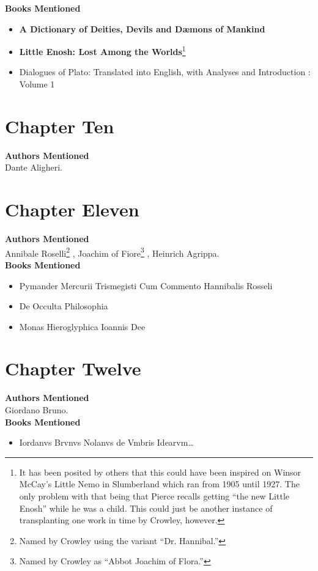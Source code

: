 \documentclass[twoside,10pt]{report}
\begin{document}
\textbf{Books Mentioned}
\begin{itemize}
\item \textbf{A Dictionary of Deities, Devils and Dæmons of Mankind} \cite{St.Phalle}
\item \textbf{Little Enosh: Lost Among the Worlds}\footnote{It has been posited by others that this could have been inspired on Winsor McCay’s Little Nemo in Slumberland which ran from 1905 until 1927. The only problem with that being that Pierce recalls getting “the new Little Enosh” while he was a child. This could just be another instance of transplanting one work in time by Crowley, however.} \cite{enosh}
\item Dialogues of Plato: Translated into English, with Analyses and Introduction : Volume 1 \cite{Jowett1871}
\end{itemize}

\section{Chapter Ten}
\textbf{Authors Mentioned}\\
Dante Aligheri.

\section{Chapter Eleven}
\textbf{Authors Mentioned}\\
Annibale Roselli\footnote{Named by Crowley using the variant ``Dr. Hannibal.''} , Joachim of Fiore\footnote{Named by Crowley as ``Abbot Joachim of Flora.''} , Heinrich Agrippa.
\\

\textbf{Books Mentioned}
\begin{itemize}
\item Pymander Mercurii Trismegisti Cum Commento Hannibalis Rosseli \cite{Rosselli1585}
\item De Occulta Philosophia \cite{Nettesheim1565}
\item Monas Hieroglyphica Ioannis Dee \cite{Dee1564}
\end{itemize}

\section{Chapter Twelve}
\textbf{Authors Mentioned}\\
Giordano Bruno.
\\

\textbf{Books Mentioned}
\begin{itemize}
\item Iordanvs Brvnvs Nolanvs de Vmbris Idearvm\ldots \cite{Bruno1582}
\end{itemize}
\end{document}
